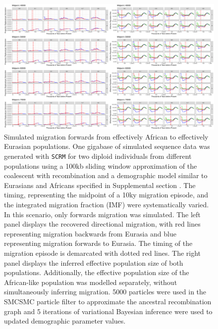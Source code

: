 \begin{figure}
	\centering
	\includegraphics[width=\textwidth]{plot/forward_different_starts.pdf}
	\caption[Simulated migration forwards from effectively African to effectively Eurasian populations]{Simulated migration forwards from effectively African to effectively Eurasian populations. One gigabase of simulated sequence data was generated with {\tt SCRM} for two diploid individuals from different populations using a 100kb sliding window approximation of the coalescent with recombination and a demographic model similar to Eurasians and Africans specified in Supplemental section . The timing, representing the midpoint of a 10ky migration episode, and the integrated migration fraction (IMF) were systematically varied. In this scenario, only forwards migration was simulated. The left panel displays the recovered directional migration, with red lines representing migration backwards from Eurasia and blue representing migration forwards to Eurasia. The timing of the migration episode is demarcated with dotted red lines. The right panel displays the inferred effective population size of both populations. Additionally, the effective population size of the African-like population was modelled separately, without simultaneously inferring migration. 5000 particles were used in the SMCSMC particle filter to approximate the ancestral recombination graph and 5 iterations of variational Bayesian inference were used to updated demographic parameter values.}
	\label{fig:fwdsim}
\end{figure}


